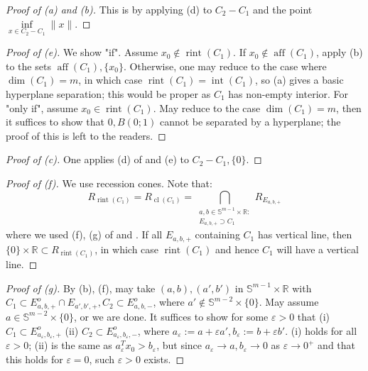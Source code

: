 \begin{proof}[Proof of (a) and (b)]
	This is by applying (d) to $C_2-C_1$ and the point $\underset{x\in C_2-C_1}{\operatorname{inf}}\|x\|$.
\end{proof}
\begin{proof}[Proof of (e)]
	We show "if". Assume $x_0\notin \operatorname{rint}(C_1)$. If $x_0\notin \operatorname{aff}(C_1)$, apply (b) to the sets $\operatorname{aff}(C_1),\{x_0\}$. Otherwise, one may reduce to the case where $\dim(C_1)=m$, in which case $\operatorname{rint}(C_1)=\operatorname{int}(C_1)$, so (a) gives a basic hyperplane separation; this would be proper as $C_1$ has non-empty interior. For "only if", assume $x_0\in \operatorname{rint}(C_1)$. May reduce to the case $\dim(C_1)=m$, then it suffices to show that $0,B(0;1)$ cannot be separated by a hyperplane; the proof of this is left to the readers.
\end{proof}
\begin{proof}[Proof of (c)]
	One applies (d) of  and (e) to $C_2-C_1,\{0\}$.
\end{proof}
\begin{proof}[Proof of (f)]
	We use recession cones. Note that:
	\[
		R_{\operatorname{rint}(C_1)}=
		R_{\operatorname{cl}(C_1)}=
		\bigcap_{\substack{a,b\in \mathbb{S}^{m-1}\times \mathbb{R}:\\E_{a,b,+}\supset C_1}}R_{E_{a,b,+}}
	\]
	where we used (f), (g) of  and . If all $E_{a,b,+}$ containing $C_1$ has vertical line, then $\{0\}\times\mathbb{R}\subset R_{\operatorname{rint}(C_1)}$, in which case $\operatorname{rint}(C_1)$ and hence $C_1$ will have a vertical line.
\end{proof}
\begin{proof}[Proof of (g)]
	By (b), (f), may take $(a,b),(a',b')$ in $\mathbb{S}^{m-1}\times \mathbb{R}$ with $C_1\subset E^o_{a,b,+}\cap E_{a',b',+},C_2\subset E^o_{a,b,-}$, where $a'\notin \mathbb{S}^{m-2}\times \{0\}$. May assume $a\in \mathbb{S}^{m-2}\times \{0\}$, or we are done. It suffices to show for some $\varepsilon >0$ that (i) $C_1\subset E^o_{a_\varepsilon,b_\varepsilon,+}$ (ii) $C_2\subset E^o_{a_\varepsilon,b_\varepsilon,-}$, where $a_\varepsilon:=a+\varepsilon a',b_\varepsilon:=b+\varepsilon b'$. (i) holds for all $\varepsilon >0$; (ii) is the same as $a_\varepsilon^T x_0>b_\varepsilon $, but since $a_\varepsilon\to a,b_\varepsilon \to 0$ as $\varepsilon \to 0^+$ and that this holds for $\varepsilon =0$, such $\varepsilon >0$ exists.
\end{proof}

